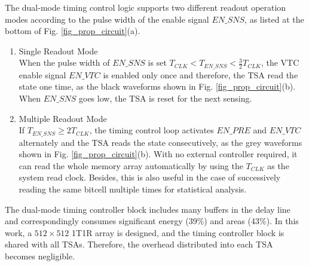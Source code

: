 The dual-mode timing control logic supports two different readout operation modes according to the pulse width of the enable signal $EN\_SNS$, as listed at the bottom of Fig. \ref{fig_prop_circuit}(a).
\begin{enumerate}
\item[1)] Single Readout Mode\\
When the pulse width of $EN\_SNS$ is set $T_{CLK}<T_{EN\_SNS}<\frac{3}{2}T_{CLK}$, the VTC enable signal $EN\_VTC$ is enabled only once and therefore, the TSA read the state one time, as the black waveforms shown in Fig. \ref{fig_prop_circuit}(b). When $EN\_SNS$ goes low, the TSA is reset for the next sensing.
\item[2)] Multiple Readout Mode\\
If $T_{EN\_SNS} \geq 2T_{CLK}$, the timing control loop activates $EN\_PRE$ and $EN\_VTC$ alternately and the TSA reads the state consecutively, as the grey waveforms shown in Fig. \ref{fig_prop_circuit}(b). With no external controller required, it can read the whole memory array automatically by using the $T_{CLK}$ as the system read clock. Besides, this is also useful in the case of successively reading the same bitcell multiple times for statistical analysis.  
\end{enumerate}



The dual-mode timing controller block includes many buffers in the delay line and correspondingly consumes significant energy (39\%) and areas (43\%). In this work, a $512 \times 512$ 1T1R array is designed, and the timing controller block is shared with all TSAs. Therefore, the overhead distributed into each TSA becomes negligible. 
